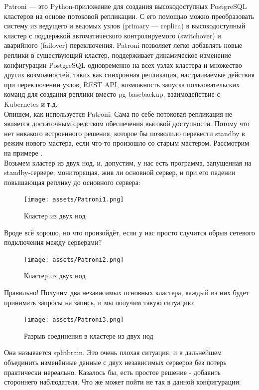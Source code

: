 Patroni — это Python-приложение для создания высокодоступных PostgreSQL кластеров на основе потоковой репликации. С его помощью можно преобразовать систему из ведущего и ведомых узлов (primary — replica) в высокодоступный кластер с поддержкой автоматического контролируемого (switchover) и аварийного (failover) переключения. Patroni позволяет легко добавлять новые реплики в существующий кластер, поддерживает динамическое изменение конфигурации PostgreSQL одновременно на всех узлах кластера и множество других возможностей, таких как синхронная репликация, настраиваемые действия при переключении узлов, REST API, возможность запуска пользовательских команд для создания реплики вместо pg basebackup, взаимодействие с Kubernetes и т.д. \autocite{Klyukin} \\

Опишем, как используется Patroni. Сама по себе потоковая репликация не является достаточным средством обеспечения высокой доступности. Потому что нет никакого встроенного решения, которое бы позволило перевести standby в режим нового мастера, если что-то произошло со старым мастером. Рассмотрим на примере \autocite{Aristov}.\\
Возьмем кластер из двух нод, и, допустим, у нас есть программа, запущенная на standby-сервере, мониторящая, жив ли основной сервер, и при его падении повышающая реплику до основного сервера:

\begin{figure}[h]
    \centering
    \texttt{[image: assets/Patroni1.png]}
    \caption{Кластер из двух нод}
    \label{fig:mesh3}
\end{figure}

Вроде всё хорошо, но что произойдёт, если у нас просто случится обрыв сетевого подключения между серверами?

\begin{figure}[h]
    \centering
    \texttt{[image: assets/Patroni2.png]}
    \caption{Кластер из двух нод}
    \label{fig:mesh4}
\end{figure}

Правильно! Получим два независимых основных кластера, каждый из них будет принимать запросы на запись, и мы получим такую ситуацию:

\begin{figure}[h]
    \centering
    \texttt{[image: assets/Patroni3.png]}
    \caption{Разрыв соединения в кластере из двух нод}
    \label{fig:mesh5}
\end{figure}

Она называется splitbrain. Это очень плохая ситуация, и в дальнейшем объединить изменённые данные с двух независимых серверов без потерь практически нереально.
Казалось бы, есть простое решение - добавить стороннего наблюдателя.
Что же может пойти не так в данной конфигурации:

